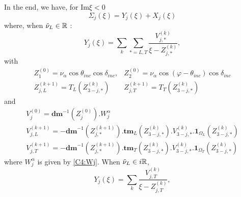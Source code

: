 In the end, we have, for  $\mbox{Im} \xi <0$
\begin{equation}
\Sigma_j(\xi)=Y_j(\xi)+X_j(\xi) \label{C4:decomp}
\end{equation}
where, when $\tilde{\nu}_L \in \mathbb{R}$ :
\begin{equation}
Y_j(\xi)=\sum_k \sum_{*=L,T} \frac{V_{j,*}^{(k)}}{\xi-Z_{j,*}^{(k)}}
\label{C4:yj},
\end{equation}
with
\begin{equation}
\begin{matrix}
Z_{1}^{(0)}=\nu_{\alpha} \cos \theta_{inc}\cos\delta_{inc},  & Z_{2}^{(0)}=\nu_{\alpha} \cos(\varphi-\theta_{inc})\cos\delta_{inc} \\
Z_{j,L}^{(k+1)}= T_L(Z_{3-j,*}^{(k)}) &Z_{j,T}^{(k+1)}= T_T(Z_{3-j,*}^{(k)}) 
\end{matrix}
\label{C4:poles}
\end{equation}
and
\begin{equation}
\begin{matrix}
V_{j}^{(0)}=\textbf{dm}^{-1}(Z_{j}^{(0)}).W_j^{\alpha}\\
V_{j,L}^{(k+1)}=-\textbf{dm}^{-1}(Z_{j,*}^{(k+1)}).\textbf{tm}_L(Z_{3-j,*}^{(k)}).V_{3-j,*}^{(k)}.\textbf{1}_{\Omega_L}(Z_{3-j,*}^{(k)}) \\ 
V_{j,T}^{(k+1)}=-\textbf{dm}^{-1}(Z_{j,*}^{(k+1)}).\textbf{tm}_T(Z_{3-j,*}^{(k)}).V_{3-j,*}^{(k)}.\textbf{1}_{\Omega_T}(Z_{3-j,*}^{(k)}) 
\end{matrix}
\label{C4:residus}
\end{equation}
where $W_j^{\alpha}$ is given by \eqref{C4:Wj}. When $\tilde{\nu}_L \in i\mathbb{R}$,
\begin{equation}
Y_j(\xi)=\sum_k \frac{V_{j,T}^{(k)}}{\xi-Z_{j,T}^{(k)}}
\label{C4:yjcr},
\end{equation}
